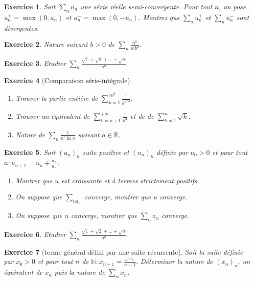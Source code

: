 \documentclass[12pt,a4paper]{article}
\newcommand{\R}{\mathbb{R}}
\newcommand{\N}{\mathbb{N}}
\theoremstyle{break}
\newtheorem{Exo}{Exercice}
\begin{document}
\begin{Exo}
	Soit $\sum_n u_{n}$ une série réelle semi-convergente. Pour tout $n$, on pose $u_{n}^{+}=\max \left(0,u_{n}\right) $ et $u_{n}^{-}=\max \left( 0,-u_{n}\right) $. Montrez que $\sum_n u_{n}^{+}$ et $\sum_n u_{n}^{-}$ sont divergentes.
\end{Exo}

\begin{Exo}
	Nature suivant $b>0$ de $\sum_n\frac{n^n}{n!b^n}$.
\end{Exo}

\begin{Exo}
	Etudier $\sum_n \frac{\sqrt{1}+\sqrt{2}+...+\sqrt{n}}{n^{\alpha}}$.
\end{Exo}


\begin{Exo}[Comparaison série-intégrale]\ 
	
	\begin{enumerate}
		\item
		Trouver la partie entière de $\sum_{k=1}^{10^9}\frac{1}{k^{2/3}}$.
		
		\item
		Trouver un équivalent de $\sum_{k=n+1}^{+\infty}\frac{1}{k^{2}}$ et de de $\sum_{k=1}^n\sqrt{k}$.
		\item 
		Nature de $\sum_{n}\frac{1}{n^a \ln n}$ suivant $a\in\R$.
	\end{enumerate}
	
\end{Exo}

\begin{Exo}
	Soit $(a_{n})_{n}$ suite positive et $(u_{n})_{n}$ définie par $u_{0}>0$ et pour tout $n:u_{n+1}=u_{n}+\frac{a_{n}}{u_{n}}$.
	\begin{enumerate}
	\item
	Montrer que $u$ est croissante et à termes strictement positifs.
	\item On suppose que $\sum_{n a_{n}}$ converge, montrer que $u$ converge.
	\item On suppose que $u$ converge, montrer que $\sum_{n} a_{n}$ converge.
	\end{enumerate}
	
\end{Exo}


\begin{Exo}
	Etudier $\sum_n \frac{\sqrt{1}+\sqrt{2}+...+\sqrt{n}}{n^{\alpha}}$.
\end{Exo}

\begin{Exo}[terme général défini par une suite récurrente]
	Soit la suite définie par $x_0>0$ et pour tout $n$ de $\N:x_{n+1}=\frac{\mathrm{e}^{-x_n}}{n+1}$. Déterminer la nature de   $(x_n)_n$, un équivalent de $x_n$ puis la nature de $\sum_n x_n$.
\end{Exo}
\end{document}
